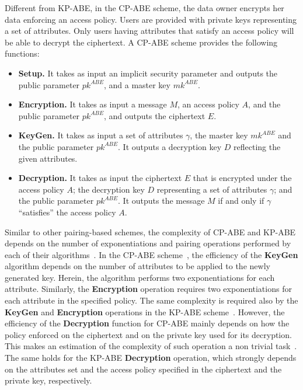 \documentclass{sig-alternate-2013}
\newcommand{\pk}{pk^{ABE}}
\newcommand{\mk}{mk^{ABE}}
\begin{document}
Different from KP-ABE, in the CP-ABE scheme, the data owner encrypts her data enforcing an access policy. Users are provided with private keys representing a set of attributes. Only users having attributes that satisfy an access policy will be able to decrypt the ciphertext.
A CP-ABE scheme provides the following functions:

\begin{itemize}

\item {\bf Setup.} It takes as input an implicit security parameter and outputs the public parameter $\pk$, and a master key $\mk$.
\item {\bf Encryption.} It takes as input a message $M$, an access policy $A$, and the public parameter $\pk$, and outputs the ciphertext $E$.
\item {\bf KeyGen.} It takes as input a set of attributes $\gamma$, the master key $\mk$ and the public parameter $\pk$. It outputs a decryption key $D$ reflecting the given attributes.
\item {\bf Decryption.} It takes as input the ciphertext $E$ that is encrypted under the access policy $A$; the
decryption key $D$ representing a set of attributes $\gamma$; and the public parameter $\pk$. It outputs the message $M$ if and only if $\gamma$ ``satisfies'' the access policy $A$.

\end{itemize}

Similar to other pairing-based schemes, the complexity of CP-ABE and KP-ABE depends on the number of exponentiations and pairing operations performed by each of their algorithms~\cite{li2010data}. 
In the CP-ABE scheme~\cite{bethencourt2007ciphertext}, the efficiency of the {\bf KeyGen} algorithm depends on the number of attributes to be applied to the newly generated key. Herein, the algorithm performs two exponentiations for each attribute. Similarly, the {\bf Encryption} operation requires two exponentiations for each attribute in the specified policy. The same complexity is required also by the {\bf KeyGen} and {\bf Encryption} operations in the KP-ABE scheme~\cite{goyal2006attribute}. However, the efficiency of the {\bf Decryption} function for CP-ABE mainly depends on how the policy enforced on the ciphertext and on the private key used for its decryption. This makes an estimation of the complexity of such operation a non trivial task~\cite{bethencourt2007ciphertext}. The same holds for the KP-ABE {\bf Decryption} operation, which strongly depends on the attributes set and the access policy specified in the ciphertext and the private key, respectively. 
\end{document}
